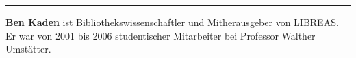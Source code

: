 \begin{center}\rule{0.5\linewidth}{\linethickness}\end{center}

\textbf{Ben Kaden} ist Bibliothekswissenschaftler und Mitherausgeber von
LIBREAS. Er war von 2001 bis 2006 studentischer Mitarbeiter bei
Professor Walther Umstätter.

